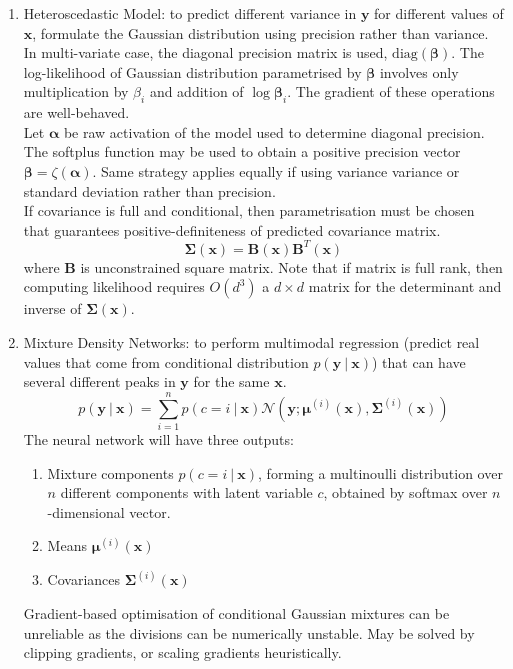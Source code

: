 \begin{remark} 
\begin{enumerate}[label=\roman*.]
\setlength{\itemsep}{0pt}
\item Heteroscedastic Model: to predict different variance in $\bm{y}$ for different values of $\bm{x}$, formulate the Gaussian distribution using precision rather than variance. In multi-variate case, the diagonal precision matrix is used, $\text{diag}(\bm{\beta})$. The log-likelihood of Gaussian distribution parametrised by $\bm{\beta}$ involves only multiplication by $\beta_i$ and addition of $\log \bm{\beta}_i$. The gradient of these operations are well-behaved.\\
Let $\bm{\alpha}$ be raw activation of the model used to determine diagonal precision. The softplus function may be used to obtain a positive precision vector $\bm{\beta} = \zeta(\bm{\alpha})$. Same strategy applies equally if using variance variance or standard deviation rather than precision.\\
If covariance is full and conditional, then parametrisation must be chosen that guarantees positive-definiteness of predicted covariance matrix.
\begin{equation}
\bm{\Sigma}(\bm{x}) = \bm{B}(\bm{x}) \bm{B}^T(\bm{x}) \nonumber
\end{equation}
where $\bm{B}$ is unconstrained square matrix. Note that if matrix is full rank, then computing likelihood requires $O(d^3)$ a $d \times d$ matrix for the determinant and inverse of $\bm{\Sigma}(\bm{x})$.
\item Mixture Density Networks: to perform multimodal regression (predict real values that come from conditional distribution $p(\bm{y} \ \vert \ \bm{x})$) that can have several different peaks in $\bm{y}$ for the same $\bm{x}$.
\begin{equation}
p(\bm{y} \ \vert \ \bm{x}) = \sum\limits_{i=1}^n p(c=i \ \vert \ \bm{x}) \mathcal{N}(\bm{y}; \bm{\mu}^{(i)} (\bm{x}), \bm{\Sigma}^{(i)} (\bm{x})) \nonumber
\end{equation}
The neural network will have three outputs:
\begin{enumerate}[label=\arabic*.]
\setlength{\itemsep}{0pt}
\item Mixture components $p(c = i \ \vert \ \bm{x})$, forming a multinoulli distribution over $n$ different components with latent variable $c$, obtained by softmax over $n$-dimensional vector.
\item Means $\bm{\mu}^{(i)}(\bm{x})$
\item Covariances $\bm{\Sigma}^{(i)}(\bm{x})$
\end{enumerate}
Gradient-based optimisation of conditional Gaussian mixtures can be unreliable as the divisions can be numerically unstable. May be solved by clipping gradients, or scaling gradients heuristically.
\end{enumerate}
\end{remark}

